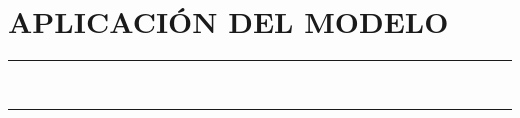 \pagestyle{plain}
\chapter{APLICACIÓN DEL MODELO}\label{cap:AplicacionModelo}
\vspace{0.2cm}
\noindent\rule{\linewidth}{1.5pt}\\
\startcontents[chapters]
\vspace{0.2cm}
\noindent\rule{\linewidth}{1.3pt}\\

\newpage


